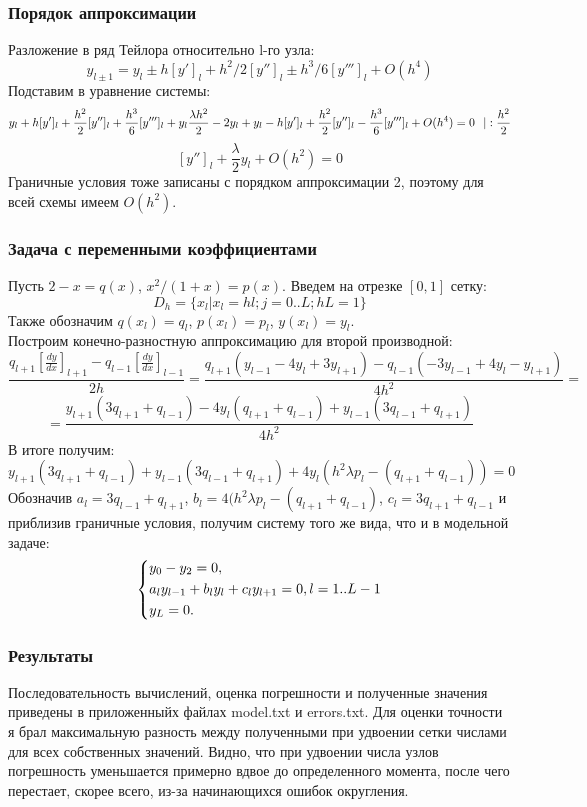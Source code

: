 \documentclass[11pt]{article}
\begin{document}
\subsubsection*{Порядок аппроксимации}
Разложение в ряд Тейлора относительно l-го узла:
\[
 y_{l\pm1} = y_l \pm h[y']_l + h^2/2[y'']_l \pm h^3/6 [y''']_l + O(h^4)
\]
Подставим в уравнение системы:
\[
 y_l + h[y']_l + \frac{h^2}{2}[y'']_l + \frac{h^3}{6}[y''']_l + y_l\frac{\lambda h^2}{2} - 2y_l + y_l - h[y']_l + \frac{h^2}{2}[y'']_l - \frac{h^3}{6}[y''']_l + O(h^4) = 0 \hspace{0.25cm}|:\frac{h^2}{2}
\]
\[
 [y'']_l + \frac{\lambda}{2}y_l + O(h^2) = 0
\]
Граничные условия тоже записаны с порядком аппроксимации 2, поэтому для всей схемы имеем $O(h^2)$.


\subsubsection*{Задача с переменными коэффициентами}
Пусть $2 - x = q(x)$, $x^2/(1+x) = p(x)$. Введем на отрезке $[0, 1]$ сетку:
\[
 D_h = \{ x_l | x_l = hl; j=0..L; hL = 1\}
\]
Также обозначим $q(x_l) = q_l$, $p(x_l) = p_l$, $y(x_l) = y_l$. \\
Построим конечно-разностную аппроксимацию для второй производной:
\[
 \frac{q_{l+1} \left[\frac{dy}{dx}\right]_{l+1} - q_{l-1}\left[\frac{dy}{dx}\right]_{l-1}}{2h} = \frac{q_{l+1}(y_{l-1} -4y_l +3y_{l+1}) - q_{l-1}(-3y_{l-1} + 4y_l - y_{l+1})}{4h^2} =  
\]
\[
 = \frac{y_{l+1}(3q_{l+1} + q_{l-1}) -4y_l(q_{l+1} + q_{l-1}) + y_{l-1}(3q_{l-1} + q_{l+1})}{4h^2}
\]
В итоге получим:
\[
 y_{l+1}(3q_{l+1} + q_{l-1}) + y_{l-1}(3q_{l-1} + q_{l+1}) + 4y_l(h^2\lambda p_l - (q_{l+1} + q_{l-1})) = 0
\]
Обозначив $a_l = 3q_{l-1} + q_{l+1}$, $b_l = 4(h^2\lambda p_l - (q_{l+1} + q_{l-1})$, $c_l = 3q_{l+1} + q_{l-1}$ и приблизив граничные условия, получим систему того же вида, что и в модельной задаче:
\[
  \begin{dcases} 
  y_0 - y_2 = 0, \\
   a_l y_{l-1} + b_l y_l + c_l y_{l+1} = 0, l=1..L-1 \\
   y_L = 0.
  \end{dcases}
\]

\subsubsection*{Результаты}

Последовательность вычислений, оценка погрешности и полученные значения приведены в приложенныйх файлах model.txt и errors.txt. Для оценки точности я брал максимальную разность между полученными при удвоении сетки числами для всех собственных значений. Видно, что при удвоении числа узлов погрешность уменьшается примерно вдвое до определенного момента, после чего перестает, скорее всего, из-за начинающихся ошибок округления. 
\end{document}
